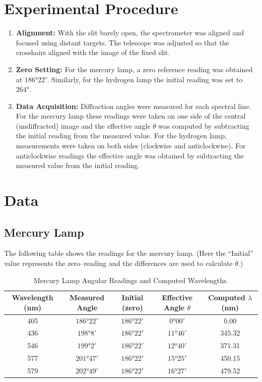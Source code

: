\documentclass[12pt]{article}
\begin{document}
\section{Experimental Procedure}
\begin{enumerate}
  \item \textbf{Alignment:} With the slit barely open, the spectrometer was aligned and focused using distant targets. The telescope was adjusted so that the crosshairs aligned with the image of the fixed slit.
  \item \textbf{Zero Setting:} For the mercury lamp, a zero reference reading was obtained at \(\ang{186;22}\). Similarly, for the hydrogen lamp the initial reading was set to \(\ang{264}\).
  \item \textbf{Data Acquisition:} Diffraction angles were measured for each spectral line. For the mercury lamp these readings were taken on one side of the central (undiffracted) image and the effective angle \(\theta\) was computed by subtracting the initial reading from the measured value. For the hydrogen lamp, measurements were taken on both sides (clockwise and anticlockwise). For anticlockwise readings the effective angle was obtained by subtracting the measured value from the initial reading.
\end{enumerate}

\section{Data}
\subsection{Mercury Lamp}
The following table shows the readings for the mercury lamp. (Here the ``Initial'' value represents the zero–reading and the differences are used to calculate \(\theta\).)
\bigskip

\begin{table}[H]
  \centering
  \caption{Mercury Lamp Angular Readings and Computed Wavelengths.}
  \begin{tabular}{ccccc}
    \toprule
    Wavelength (nm) & Measured Angle & Initial (zero) & Effective Angle \(\theta\) & Computed \(\lambda\) (nm) \\
    \midrule
    405 & \(\ang{186;22}\) & \(\ang{186;22}\) & \(\ang{0;00}\) & 0.00 \\
    436 & \(\ang{198;8}\)  & \(\ang{186;22}\) & \(\ang{11;46}\) & 345.32 \\
    546 & \(\ang{199;2}\)  & \(\ang{186;22}\) & \(\ang{12;40}\) & 371.31 \\
    577 & \(\ang{201;47}\) & \(\ang{186;22}\) & \(\ang{15;25}\) & 450.15 \\
    579 & \(\ang{202;49}\) & \(\ang{186;22}\) & \(\ang{16;27}\) & 479.52 \\
    \bottomrule
  \end{tabular}
  \label{tab:mercury}
\end{table}
\end{document}
